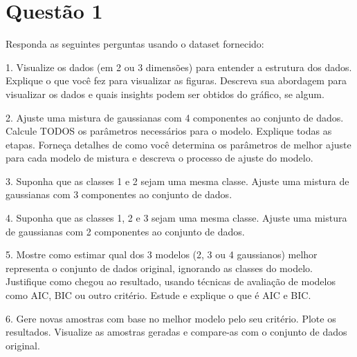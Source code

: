 \section{Questão 1}
Responda as seguintes perguntas usando o dataset fornecido:

1. Visualize os dados (em 2 ou 3 dimensões) para entender a estrutura dos dados.
Explique o que você fez para visualizar as figuras. Descreva sua abordagem para visualizar os dados e quais insights podem ser obtidos do gráfico, se algum.

2. Ajuste uma mistura de gaussianas com 4 componentes ao conjunto de dados. Calcule TODOS os parâmetros necessários para o modelo. Explique todas as etapas. Forneça detalhes de como você determina os parâmetros de melhor ajuste para cada modelo de mistura e descreva o processo de ajuste do modelo.

3. Suponha que as classes 1 e 2 sejam uma mesma classe. Ajuste uma mistura de gaussianas com 3 componentes ao conjunto de dados.

4. Suponha que as classes 1, 2 e 3 sejam uma mesma classe. Ajuste uma mistura de gaussianas com 2 componentes ao conjunto de dados.

5. Mostre como estimar qual dos 3 modelos (2, 3 ou 4 gaussianos) melhor representa o conjunto de dados original, ignorando as classes do modelo. Justifique como chegou ao resultado, usando técnicas de avaliação de modelos como AIC, BIC ou outro critério. Estude e explique o que é AIC e BIC.

6. Gere novas amostras com base no melhor modelo pelo seu critério. Plote os resultados. Visualize as amostras geradas e compare-as com o conjunto de dados original.
